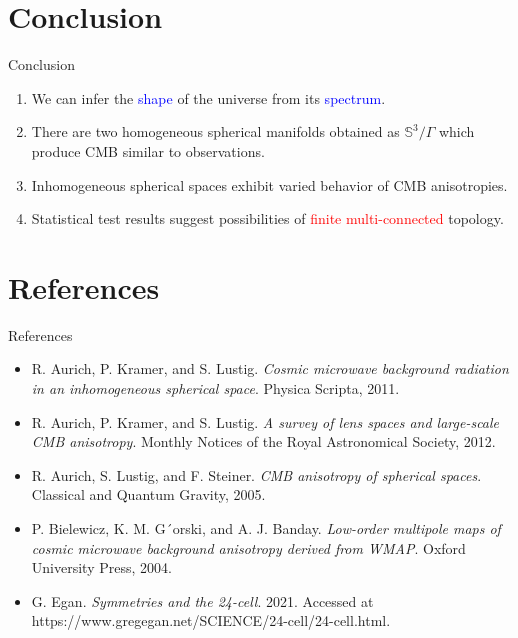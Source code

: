 \documentclass{beamer}
\renewcommand{\S}{\mathbb{S}}
\begin{document}
\section{Conclusion}
\begin{frame}{Conclusion}
	\pause
	\begin{enumerate}
		\item We can infer the \textcolor{blue}{shape} of the universe from its \textcolor{blue}{spectrum}.

		      \pause
		\item There are two homogeneous spherical manifolds obtained as $\S^3/\Gamma$ which produce CMB similar to observations.

		      \pause
		\item Inhomogeneous spherical spaces exhibit varied behavior of CMB anisotropies.

		      \pause
		\item Statistical test results suggest possibilities of \textcolor{red}{finite multi-connected} topology.
	\end{enumerate}
\end{frame}


\section{References}
\begin{frame}{References}
	\begin{itemize}
		\item [1] R. Aurich, P. Kramer, and S. Lustig. \textit{Cosmic microwave background radiation in an inhomogeneous spherical space}. Physica Scripta, 2011.
		\item [2] R. Aurich, P. Kramer, and S. Lustig. \textit{A survey of lens spaces and large-scale CMB anisotropy}. Monthly Notices of the Royal Astronomical Society, 2012.
		\item [3] R. Aurich, S. Lustig, and F. Steiner. \textit{CMB anisotropy of spherical spaces}. Classical and Quantum Gravity, 2005.
		\item [4] P. Bielewicz, K. M. G´orski, and A. J. Banday. \textit{Low-order multipole maps of cosmic microwave background anisotropy derived from WMAP}. Oxford University Press, 2004.
		\item [5]G. Egan. \textit{Symmetries and the 24-cell}. 2021. Accessed at https://www.gregegan.net/SCIENCE/24-cell/24-cell.html.
	\end{itemize}
\end{frame}
\end{document}
